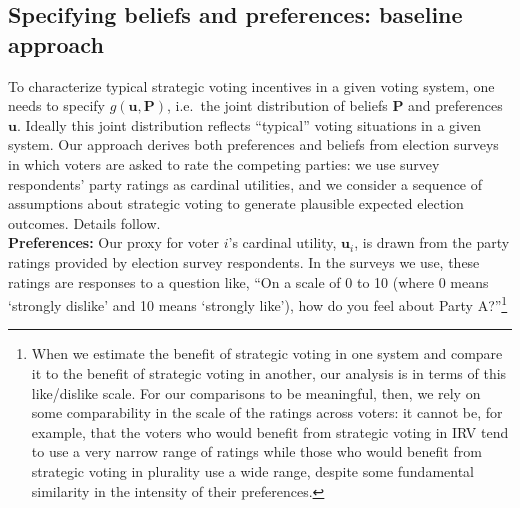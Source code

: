\documentclass[11pt,a4paper]{article}
\begin{document}
\subsection{Specifying beliefs and preferences: baseline approach}

To characterize typical strategic voting incentives in a given voting system, one needs to specify $g(\mathbf{u}, \mathbf{P})$, i.e.\ the joint distribution of beliefs $\mathbf{P}$ and preferences $\mathbf{u}$. Ideally this joint distribution reflects ``typical'' voting situations in a given system. %
Our approach derives both preferences and beliefs from election surveys in which voters are asked to rate the competing parties: we use survey respondents' party ratings as cardinal utilities, and we consider a sequence of assumptions about strategic voting to generate plausible expected election outcomes. 
Details follow. \\

\noindent \textbf{Preferences:} Our proxy for voter $i$'s cardinal utility, $\mathbf{u}_i$, is drawn from the party ratings provided by election survey respondents. In the surveys we use, these ratings are responses to a question like, ``On a scale of 0 to 10 (where 0 means `strongly dislike' and 10 means `strongly like'), how do you feel about Party A?''\footnote{When we estimate the benefit of strategic voting in one system and compare it to the benefit of strategic voting in another, our analysis is in terms of this like/dislike scale. For our comparisons to be meaningful, then, we rely on some comparability in the scale of the ratings across voters: it cannot be, for example, that the voters who would benefit from strategic voting in IRV tend to use a very narrow range of ratings while those who would benefit from strategic voting in plurality use a wide range, despite some fundamental similarity in the intensity of their preferences.} \\ 


\end{document}
